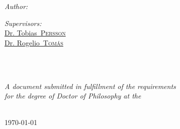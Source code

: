 \documentclass[
11pt, %
english, %
singlespacing, %
headsepline, %
]{MastersDoctoralThesis} %
\begin{document}
\begin{titlepage}
\begin{center}
\vspace{1cm}

\begin{minipage}[t]{0.4\textwidth}
\begin{flushleft} \large
\emph{Author:}\\
\href{https://www.liverpool.ac.uk/quasar/the-quasars/felix-soubelet/}{\authorname} %
\end{flushleft}
\end{minipage}
\begin{minipage}[t]{0.4\textwidth}
\begin{flushright} \large
\emph{Supervisors:}\\
\href{https://www.researchgate.net/profile/Tobias-Persson}{Dr. Tobias~\textsc{Persson}}\\
\href{https://rtomas.web.cern.ch/rtomas/}{Dr. Rogelio~\textsc{Tom\'as}}\\
\href{https://www.liverpool.ac.uk/quasar/the-quasars/carsten_welsch/}{\supname}\\
\end{flushright}
\end{minipage}\\[1.7cm]
 
\vfill

\large \textit{A document submitted in fulfillment of the requirements\\ for the degree of Doctor of Philosophy at the}\\[0.3cm] %
\univname \ \deptname\\[2cm] %
 
\vfill

{\large \today}\\[4.5cm] %
 
\vfill
\end{center}
\end{titlepage}


\end{document}

